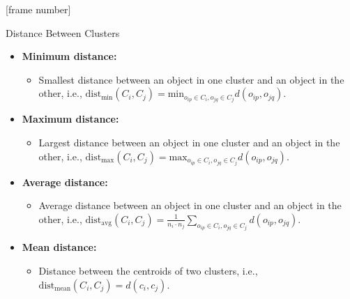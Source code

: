 \documentclass[aspectratio=169,t,xcolor=dvipsnames]{beamer}
\begin{document}
  { %
    [frame number]
    \begin{frame}{Distance Between Clusters}
      \begin{itemize}
        \item \textbf{Minimum distance:}
        \begin{itemize}
          \item Smallest distance between an object in one cluster and an object in the other, i.e., $\text{dist}_{\text{min}} (C_i, C_j) = \text{min}_{o_{ip} \in C_i, o_{jq} \in C_j} d(o_{ip}, o_{jq})$.
        \end{itemize}
        \item \textbf{Maximum distance:}
        \begin{itemize}
          \item Largest distance between an object in one cluster and an object in the other, i.e., $\text{dist}_\text{max}(C_i, C_j) = \text{max}_{o_{ip} \in C_i, o_{jq} \in C_j} d(o_{ip}, o_{jq}).$
        \end{itemize}
        \item \textbf{Average distance:}
        \begin{itemize}
          \item Average distance between an object in one cluster and an object in the other, i.e., $\text{dist}_{\text{avg}} (C_i, C_j) = \frac{1}{n_i \cdot n_j} \sum_{o_{ip} \in C_i, o_{jq} \in C_j} d(o_{ip}, o_{jq}).$
        \end{itemize}
        \item \textbf{Mean distance:}
        \begin{itemize}
          \item Distance between the centroids of two clusters, i.e., $\text{dist}_{\text{mean}} (C_i, C_j) = d(c_i, c_j).$
        \end{itemize}
      \end{itemize}
    \end{frame}
  }
\end{document}
